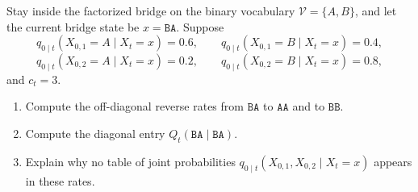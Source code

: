 \documentclass[11pt]{article}
\newif\ifshowsolutions
\newcommand{\SolutionBox}[2][10]{%
  \ifshowsolutions
    \begin{tcolorbox}[stat221panelgray,title={Solution}]
    #2
    \end{tcolorbox}
  \else
    \begin{tcolorbox}[stat221panelgray,unbreakable,title={Workspace}]
    \vspace{#1\baselineskip}
    \end{tcolorbox}
  \fi
}
\begin{document}
\begin{exercise}
\label{ex:reading-factorized-rates}
Stay inside the factorized bridge on the binary vocabulary \(\mathcal{V}=\{A,B\}\), and let the current bridge state be \(x=\texttt{BA}\).
Suppose
\[
  q_{0\mid t}(X_{0,1}=A\mid X_t=x)=0.6,
  \qquad
  q_{0\mid t}(X_{0,1}=B\mid X_t=x)=0.4,
\]
\[
  q_{0\mid t}(X_{0,2}=A\mid X_t=x)=0.2,
  \qquad
  q_{0\mid t}(X_{0,2}=B\mid X_t=x)=0.8,
\]
and \(c_t=3\).
\begin{enumerate}[leftmargin=*]
  \item Compute the off-diagonal reverse rates from \(\texttt{BA}\) to \(\texttt{AA}\) and to \(\texttt{BB}\).
  \item Compute the diagonal entry \(Q_t(\texttt{BA}\mid \texttt{BA})\).
  \item Explain why no table of joint probabilities \(q_{0\mid t}(X_{0,1},X_{0,2}\mid X_t=x)\) appears in these rates.
\end{enumerate}
\end{exercise}
\SolutionBox[10]{The neighbor \(\texttt{AA}\) is \(x^{1\to A}\), so \eqref{eq:factorized-rate} gives
\[
  Q_t(\texttt{AA}\mid \texttt{BA})
  =
  3\cdot q_{0\mid t}(X_{0,1}=A\mid X_t=x)
  =
  3(0.6)
  =
  1.8.
\]
Similarly \(\texttt{BB}=x^{2\to B}\), so
\[
  Q_t(\texttt{BB}\mid \texttt{BA})
  =
  3\cdot q_{0\mid t}(X_{0,2}=B\mid X_t=x)
  =
  3(0.8)
  =
  2.4.
\]
The row sum must vanish, hence
\[
  Q_t(\texttt{BA}\mid \texttt{BA})=-(1.8+2.4)=-4.2.
\]
No joint two-token table appears because the factorized bridge only allows one-token backward switches at first order.
Once the local move set is restricted to \(x^{j\to v}\), the reverse generator queries the posterior only through one-coordinate marginals.}
\end{document}
